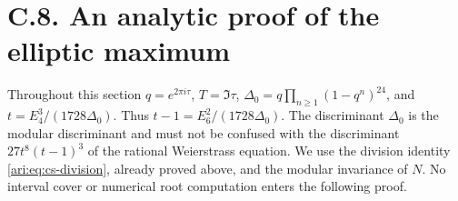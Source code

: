 \section{C.8. An analytic proof of the elliptic maximum}

Throughout this section $q=e^{2\pi i\tau}$, $T=\Im\tau$,
$\Delta_0=q\prod_{n\ge1}(1-q^n)^{24}$, and
$t=E_4^3/(1728\Delta_0)$. Thus $t-1=E_6^2/(1728\Delta_0)$.
The discriminant $\Delta_0$ is the modular discriminant and must not
be confused with the discriminant $27t^8(t-1)^3$ of the rational
Weierstrass equation. We use the division identity
\eqref{ari:eq:cs-division}, already proved above, and the modular
invariance of $N$. No interval cover or numerical root computation
enters the following proof.

